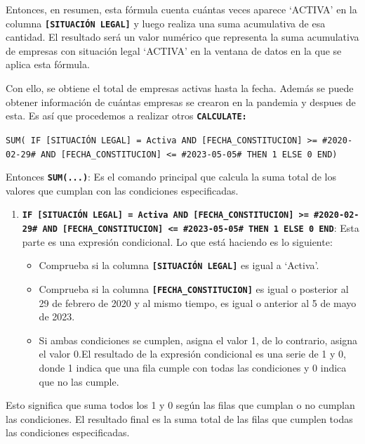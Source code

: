 \documentclass[
]{article}
\begin{document}
Entonces, en resumen, esta fórmula cuenta cuántas veces aparece `ACTIVA'
en la columna \textbf{\texttt{{[}SITUACIÓN\ LEGAL{]}}} y luego realiza
una suma acumulativa de esa cantidad. El resultado será un valor
numérico que representa la suma acumulativa de empresas con situación
legal `ACTIVA' en la ventana de datos en la que se aplica esta fórmula.

Con ello, se obtiene el total de empresas activas hasta la fecha. Además
se puede obtener información de cuántas empresas se crearon en la
pandemia y despues de esta. Es así que procedemos a realizar otros
\textbf{\texttt{CALCULATE:}}

\texttt{SUM(\ IF\ {[}SITUACIÓN\ LEGAL{]}\ =\ \textquotesingle{}Activa\textquotesingle{}\ AND\ {[}FECHA\_CONSTITUCION{]}\ \textgreater{}=\ \#2020-02-29\#\ AND\ {[}FECHA\_CONSTITUCION{]}\ \textless{}=\ \#2023-05-05\#\ THEN\ 1\ ELSE\ 0\ END)}

Entonces \textbf{\texttt{SUM(...)}}: Es el comando principal que calcula
la suma total de los valores que cumplan con las condiciones
especificadas.

\begin{enumerate}
\def\labelenumi{\arabic{enumi}.}
\item
  \textbf{\texttt{IF\ {[}SITUACIÓN\ LEGAL{]}\ =\ \textquotesingle{}Activa\textquotesingle{}\ AND\ {[}FECHA\_CONSTITUCION{]}\ \textgreater{}=\ \#2020-02-29\#\ AND\ {[}FECHA\_CONSTITUCION{]}\ \textless{}=\ \#2023-05-05\#\ THEN\ 1\ ELSE\ 0\ END}}:
  Esta parte es una expresión condicional. Lo que está haciendo es lo
  siguiente:

  \begin{itemize}
  \item
    Comprueba si la columna \textbf{\texttt{{[}SITUACIÓN\ LEGAL{]}}} es
    igual a `Activa'.
  \item
    Comprueba si la columna \textbf{\texttt{{[}FECHA\_CONSTITUCION{]}}}
    es igual o posterior al 29 de febrero de 2020 y al mismo tiempo, es
    igual o anterior al 5 de mayo de 2023.
  \item
    Si ambas condiciones se cumplen, asigna el valor 1, de lo contrario,
    asigna el valor 0.El resultado de la expresión condicional es una
    serie de 1 y 0, donde 1 indica que una fila cumple con todas las
    condiciones y 0 indica que no las cumple.
  \end{itemize}
\end{enumerate}

Esto significa que suma todos los 1 y 0 según las filas que cumplan o no
cumplan las condiciones. El resultado final es la suma total de las
filas que cumplen todas las condiciones especificadas.
\end{document}
